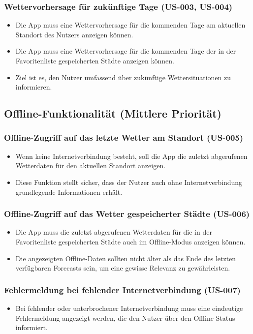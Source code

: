 \documentclass{article}
\begin{document}
\subsubsection{Wettervorhersage für zukünftige Tage (US-003, US-004)}
\begin{itemize}
    \item Die App muss eine Wettervorhersage für die kommenden Tage am aktuellen Standort des Nutzers anzeigen können.
    \item Die App muss eine Wettervorhersage für die kommenden Tage der in der Favoritenliste gespeicherten Städte anzeigen können.
    \item Ziel ist es, den Nutzer umfassend über zukünftige Wettersituationen zu informieren.
\end{itemize}

\subsection{Offline-Funktionalität (Mittlere Priorität)}

\subsubsection{Offline-Zugriff auf das letzte Wetter am Standort (US-005)}
\begin{itemize}
    \item Wenn keine Internetverbindung besteht, soll die App die zuletzt abgerufenen Wetterdaten für den aktuellen Standort anzeigen.
    \item Diese Funktion stellt sicher, dass der Nutzer auch ohne Internetverbindung grundlegende Informationen erhält.
\end{itemize}

\subsubsection{Offline-Zugriff auf das Wetter gespeicherter Städte (US-006)}
\begin{itemize}
    \item Die App muss die zuletzt abgerufenen Wetterdaten für die in der Favoritenliste gespeicherten Städte auch im Offline-Modus anzeigen können.
    \item Die angezeigten Offline-Daten sollten nicht älter als das Ende des letzten verfügbaren Forecasts sein, um eine gewisse Relevanz zu gewährleisten.
\end{itemize}

\subsubsection{Fehlermeldung bei fehlender Internetverbindung (US-007)}
\begin{itemize}
    \item Bei fehlender oder unterbrochener Internetverbindung muss eine eindeutige Fehlermeldung angezeigt werden, die den Nutzer über den Offline-Status informiert.
\end{itemize}
\end{document}
